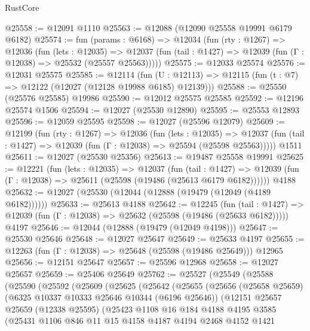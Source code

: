 \begin{lexlean}{RustCore}
\begin{coremodule}
@25558 := @12091 @1110
@25563 := @12088 (@12090 @25558 @19991 @6179 @6182)
@25574 := fun (params : @6168) =>
  @12034
    (fun (rty : @1267) =>
    @12036
      (fun (lets : @12035) =>
      @12037 (fun (tail : @1427) => @12039 (fun (Γ : @12038) => @25532 (@25557 @25563)))))
@25575 := @12033 @25574
@25576 := @12031 @25575
@25585 := @12114
    (fun (U : @12113) => @12115 (fun (t : @7) => @12122 (@12027 (@12128 @19988 @6185) @12139)))
@25588 := @25550 (@25576 @25585) @19986
@25590 := @12012 @25575 @25585
@25592 := @12196 @25574 @1506
@25594 := @12027 (@25530 @12890)
@25595 := @25553 @12893
@25596 := @12059 @25595
@25598 := @12027 (@25596 @12079)
@25609 := @12199
    (fun (rty : @1267) =>
    @12036
      (fun (lets : @12035) =>
      @12037 (fun (tail : @1427) => @12039 (fun (Γ : @12038) => @25594 (@25598 @25563)))))
    @1511
@25611 := @12027 (@25530 @25356)
@25613 := @19487 @25558 @19991
@25625 := @12221
    (fun (lets : @12035) =>
    @12037
      (fun (tail : @1427) =>
      @12039 (fun (Γ : @12038) => @25611 (@25598 (@19486 (@25613 @6179 @6182))))))
    @4188
@25632 := @12027 (@25530 (@12044 (@12888 (@19479 (@12049 (@4189 @6182))))))
@25633 := @25613 @4188
@25642 := @12245
    (fun (tail : @1427) => @12039 (fun (Γ : @12038) => @25632 (@25598 (@19486 (@25633 @6182)))))
    @4197
@25646 := @12044 (@12888 (@19479 (@12049 @4198)))
@25647 := @25530 @25646
@25648 := @12027 @25647
@25649 := @25633 @4197
@25655 := @12263 (fun (Γ : @12038) => @25648 (@25598 (@19486 @25649))) @12965
@25656 := @12151 @25647
@25657 := @25596 @12968
@25658 := @12027 @25657
@25659 := @25406 @25649
@25762 := @25527
    (@25549
      (@25588
        (@25590
          (@25592
            (@25609
              (@25625
                (@25642
                  (@25655
                    (@25656
                      (@25658 @25659)
                      (@6325 @10337 @10333 @25646 @10344 (@6196 @25646))
                      (@12151
                        @25657
                        @25659
                        (@12338 @25595)
                        (@25423
                          @1108
                          @16
                          @184
                          @4188
                          @4195
                          @3585
                          (@25431
                            @1106
                            @846
                            @11
                            @15
                            @4158
                            @4187
                            @4194
                            @2468
                            @4152
                            @1421

\end{coremodule}
\end{lexlean}
